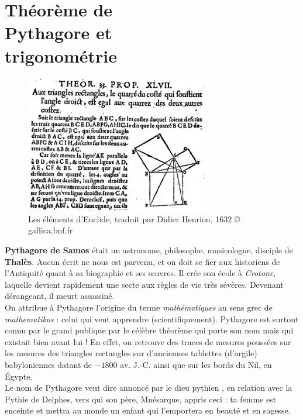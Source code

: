 \chapter{Théorème de\\Pythagore et\\trigonométrie} \label{G10}

\bigskip

\begin{figure}[h]
   \centering
      \includegraphics[height=6cm]{Geometrie/Images/G10_intro_Pythagore_Euclide}
   \caption{Les éléments d'Euclide, traduit par Didier Henrion, 1632 © gallica.bnf.fr}
\end{figure}

\begin{prerequis}
   {\bf Pythagore de Samos}  était un astronome, philosophe, musicologue, disciple de {\bf Thalès}. Aucun écrit ne nous est parvenu, et on doit se fier aux historiens de l'Antiquité quant à sa biographie et ses \oe uvres. Il crée son école à \textit{Crotone}, laquelle devient rapidement une secte aux règles de vie très sévères. Devenant dérangeant, il meurt assassiné. \\ 
   On attribue à Pythagore l'origine du terme \textit{mathématiques} au sens grec de \textit{mathematikos} : celui qui veut apprendre (scientifiquement). Pythagore est surtout connu par le \og grand publique \fg{} par le célèbre théorème qui porte son nom mais qui existait bien avant lui ! En effet, on retrouve des traces de mesures poussées sur les mesures des triangles rectangles sur d'anciennes tablettes (d'argile) babyloniennes datant de $-1800$ av. J.-C. ainsi que sur les bords du Nil, en Égypte. \\
    Le nom de Pythagore veut dire \og annoncé par le dieu pythien \fg, en relation 
 avec la Pythie de Delphes, vers qui son père, Mnésarque, appris ceci : \og ta femme est enceinte et mettra au monde un enfant qui l'emportera en beauté et en sagesse. \fg  
\end{prerequis}

